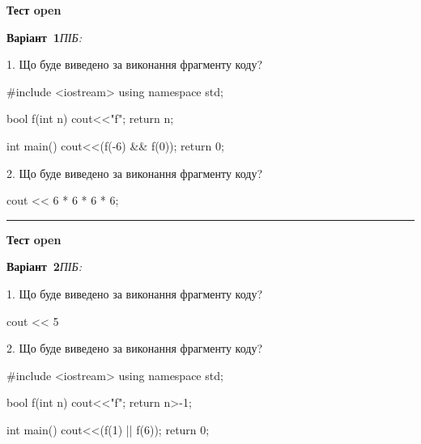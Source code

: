 \documentclass[11pt]{article}
\begin{document}
{\large\textbf{Тест open}}

\textbf{Варіант \No\,1}\hfill \textit{ПІБ:}\,\underline{\hspace{60mm}}
\vspace{4mm}

1. Що буде виведено за виконання фрагменту коду?

#include <iostream>
using namespace std;

bool f(int n){
    cout<<"f";
    return n;
}

int main(){
    cout<<(f(-6) && f(0));
    return 0;
}

2. Що буде виведено за виконання фрагменту коду?

cout << 6 * 6 * 6 * 6;



\vspace{10mm}
\noindent\rule{\textwidth}{0.3pt}
\vspace{8mm}
{\large\textbf{Тест open}}

\textbf{Варіант \No\,2}\hfill \textit{ПІБ:}\,\underline{\hspace{60mm}}
\vspace{4mm}

1. Що буде виведено за виконання фрагменту коду?

cout << 5 %

2. Що буде виведено за виконання фрагменту коду?

#include <iostream>
using namespace std;

bool f(int n){
    cout<<"f";
    return n>-1;
}

int main(){
    cout<<(f(1) || f(6));
    return 0;
}



\newpage
\end{document}
